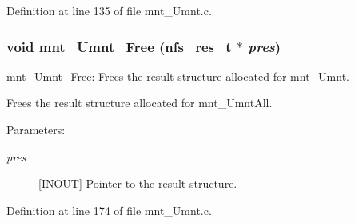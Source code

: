 Definition at line 135 of file mnt\_\-Umnt.c.
\subsubsection{\setlength{\rightskip}{0pt plus 5cm}void mnt\_\-Umnt\_\-Free (nfs\_\-res\_\-t $\ast$ {\em pres})}\label{mnt__Umnt_8c_a1}


mnt\_\-Umnt\_\-Free: Frees the result structure allocated for mnt\_\-Umnt.

Frees the result structure allocated for mnt\_\-Umnt\-All.

\begin{Desc}
\item[Parameters:]
\begin{description}
\item[{\em pres}][INOUT] Pointer to the result structure. \end{description}
\end{Desc}


Definition at line 174 of file mnt\_\-Umnt.c.